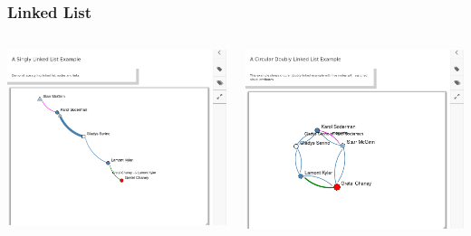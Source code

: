 \documentclass[aspectratio=169]{beamer}
\begin{document}
\begin{frame}
  \frametitle{Linked List}

  \begin{columns}
    \includegraphics[width=1\linewidth]{viz_figs/LinkedList1.png}

    \includegraphics[width=1\linewidth]{viz_figs/CircularList.png}
  \end{columns}
  
\end{frame}
\end{document}
